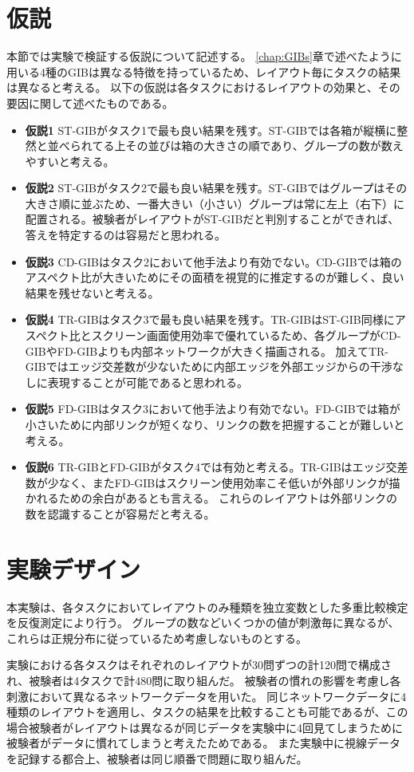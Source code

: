 \documentclass{kuee}
\begin{document}
\section{仮説}
\label{sec:hypothesis}
本節では実験で検証する仮説について記述する。
\ref{chap:GIBs}章で述べたように用いる4種のGIBは異なる特徴を持っているため、レイアウト毎にタスクの結果は異なると考える。
以下の仮説は各タスクにおけるレイアウトの効果と、その要因に関して述べたものである。
\begin{itemize}
  \item{\bf 仮説1} ST-GIBがタスク1で最も良い結果を残す。ST-GIBでは各箱が縦横に整然と並べられてる上その並びは箱の大きさの順であり、グループの数が数えやすいと考える。
  \item{\bf 仮説2} ST-GIBがタスク2で最も良い結果を残す。ST-GIBではグループはその大きさ順に並ぶため、一番大きい（小さい）グループは常に左上（右下）に配置される。被験者がレイアウトがST-GIBだと判別することができれば、答えを特定するのは容易だと思われる。
  \item{\bf 仮説3} CD-GIBはタスク2において他手法より有効でない。CD-GIBでは箱のアスペクト比が大きいためにその面積を視覚的に推定するのが難しく、良い結果を残せないと考える。
  \item{\bf 仮説4} TR-GIBはタスク3で最も良い結果を残す。TR-GIBはST-GIB同様にアスペクト比とスクリーン画面使用効率で優れているため、各グループがCD-GIBやFD-GIBよりも内部ネットワークが大きく描画される。
  加えてTR-GIBではエッジ交差数が少ないために内部エッジを外部エッジからの干渉なしに表現することが可能であると思われる。
  \item{\bf 仮説5} FD-GIBはタスク3において他手法より有効でない。FD-GIBでは箱が小さいために内部リンクが短くなり、リンクの数を把握することが難しいと考える。
  \item{\bf 仮説6} TR-GIBとFD-GIBがタスク4では有効と考える。TR-GIBはエッジ交差数が少なく、またFD-GIBはスクリーン使用効率こそ低いが外部リンクが描かれるための余白があるとも言える。
  これらのレイアウトは外部リンクの数を認識することが容易だと考える。
\end{itemize}

\section{実験デザイン}
本実験は、各タスクにおいてレイアウトのみ種類を独立変数とした多重比較検定を反復測定により行う。
グループの数などいくつかの値が刺激毎に異なるが、これらは正規分布に従っているため考慮しないものとする。

実験における各タスクはそれぞれのレイアウトが30問ずつの計120問で構成され、被験者は4タスクで計480問に取り組んだ。
被験者の慣れの影響を考慮し各刺激において異なるネットワークデータを用いた。
同じネットワークデータに4種類のレイアウトを適用し、タスクの結果を比較することも可能であるが、この場合被験者がレイアウトは異なるが同じデータを実験中に4回見てしまうために被験者がデータに慣れてしまうと考えたためである。
また実験中に視線データを記録する都合上、被験者は同じ順番で問題に取り組んだ。
\end{document}
